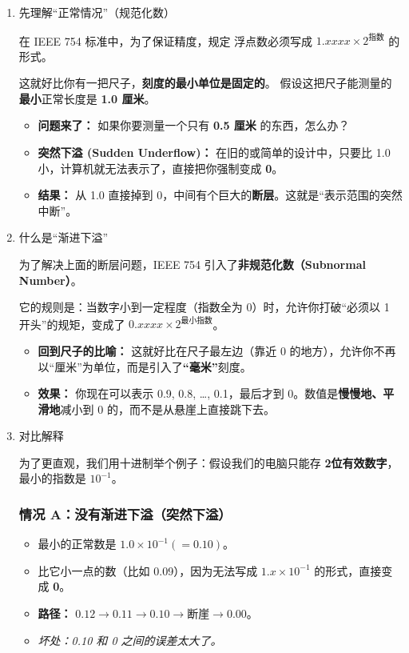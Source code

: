 \begin{enumerate}[label=\ding{\numexpr171+\arabic*}]
 \item 先理解“正常情况”（规范化数）
 
在 IEEE 754 标准中，为了保证精度，规定
浮点数必须写成 $1.xxxx \times 2^{\text{指数}}$ 的形式。

这就好比你有一把尺子，\textbf{刻度的最小单位是固定的}。
假设这把尺子能测量的\textbf{最小}正常长度是 \textbf{1.0 厘米}。

\begin{itemize}
    \item \textbf{问题来了：} 如果你要测量一个只有 \textbf{0.5 厘米} 的东西，怎么办？
    \item \textbf{突然下溢 (Sudden Underflow)：} 在旧的或简单的设计中，只要比 1.0 小，计算机就无法表示了，直接把你强制变成 \textbf{0}。
    \item \textbf{结果：} 从 1.0 直接掉到 0，中间有个巨大的\textbf{断层}。这就是“表示范围的突然中断”。
\end{itemize}






 \item 什么是“渐进下溢”
 
为了解决上面的断层问题，IEEE 754 引入了\textbf{非规范化数（Subnormal Number）}。

它的规则是：当数字小到一定程度（指数全为 0）时，允许你打破“必须以 1 开头”的规矩，变成了 $0.xxxx \times 2^{\text{最小指数}}$。

\begin{itemize}
    \item \textbf{回到尺子的比喻：} 这就好比在尺子最左边（靠近 0 的地方），允许你不再以“厘米”为单位，而是引入了\textbf{“毫米”}刻度。
    \item \textbf{效果：} 你现在可以表示 0.9, 0.8, \dots, 0.1，最后才到 0。数值是\textbf{慢慢地、平滑地}减小到 0 的，而不是从悬崖上直接跳下去。
\end{itemize}
 

\newpage

 \item 对比解释


为了更直观，我们用十进制举个例子：假设我们的电脑只能存 \textbf{2位有效数字}，最小的指数是 $10^{-1}$。

\subsubsection*{情况 A：没有渐进下溢（突然下溢）}
\begin{itemize}
    \item 最小的正常数是 $1.0 \times 10^{-1} (= 0.10)$。
    \item 比它小一点的数（比如 0.09），因为无法写成 $1.x \times 10^{-1}$ 的形式，直接变成 \textbf{0}。
    \item \textbf{路径：} $0.12 \to 0.11 \to 0.10 \to \textbf{断崖} \to 0.00$。
    \item \textit{坏处：0.10 和 0 之间的误差太大了。}
\end{itemize}


\end{enumerate}
